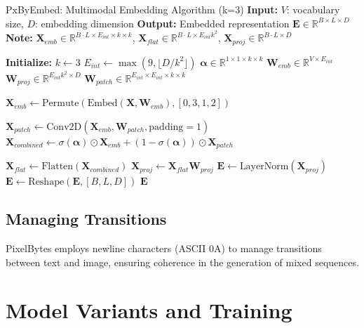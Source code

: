 \documentclass[10pt,a4paper]{article}
\begin{document}
\begin{algorithm}[h]
\caption{PxByEmbed: Multimodal Embedding Algorithm (k=3)
\newline
\textbf{Input:} $V$: vocabulary size, $D$: embedding dimension
\newline
\textbf{Output:} Embedded representation $\mathbf{E} \in \mathbb{R}^{B \times L \times D}$
\newline
\textbf{Note:} $\mathbf{X}_{emb} \in \mathbb{R}^{B \cdot L \times E_{int} \times k \times k}$, 
$\mathbf{X}_{flat} \in \mathbb{R}^{B \cdot L \times E_{int}k^2}$, 
$\mathbf{X}_{proj} \in \mathbb{R}^{B \cdot L \times D}$
}
\begin{algorithmic}[0]
\State \textbf{Initialize:}
\State $k \gets 3$
\State $E_{int} \gets \max(9, \lfloor D / k^2 \rfloor)$
\State $\mathbf{\alpha} \in \mathbb{R}^{1 \times 1 \times k \times k}$ 
\State $\mathbf{W}_{emb} \in \mathbb{R}^{V \times E_{int}}$ 
\State $\mathbf{W}_{proj} \in \mathbb{R}^{E_{int}k^2 \times D}$ 
\State $\mathbf{W}_{patch} \in \mathbb{R}^{E_{int} \times E_{int} \times k \times k}$ 

    \State $\mathbf{X}_{emb} \gets \text{Permute}(\text{Embed}(\mathbf{X}, \mathbf{W}_{emb}), [0, 3, 1, 2])$ 
    
    \State $\mathbf{X}_{patch} \gets \text{Conv2D}(\mathbf{X}_{emb}, \mathbf{W}_{patch}, \text{padding}=1)$
    \State $\mathbf{X}_{combined} \gets \sigma(\mathbf{\alpha}) \odot \mathbf{X}_{emb} + (1 - \sigma(\mathbf{\alpha})) \odot \mathbf{X}_{patch}$
    
    \State $\mathbf{X}_{flat} \gets \text{Flatten}(\mathbf{X}_{combined})$ 
    \State $\mathbf{X}_{proj} \gets \mathbf{X}_{flat}\mathbf{W}_{proj}$ 
    \State $\mathbf{E} \gets \text{LayerNorm}(\mathbf{X}_{proj})$
    \State $\mathbf{E} \gets \text{Reshape}(\mathbf{E}, [B, L, D])$
    \State \Return $\mathbf{E}$
\EndFunction
\end{algorithmic}
\end{algorithm}

\subsection{Managing Transitions}
PixelBytes employs newline characters (ASCII 0A) to manage transitions between text and image, ensuring coherence in the generation of mixed sequences.

\section{Model Variants and Training}
\end{document}
